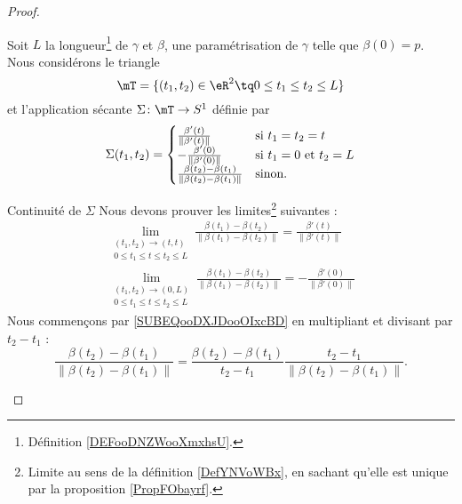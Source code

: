 \begin{proof}
\begin{subproof}
            Soit \( L\) la longueur\footnote{Définition \ref{DEFooDNZWooXmxhsU}.} de \( \gamma\) et \( \beta\), une paramétrisation de \( \gamma\) telle que \( \beta(0)=p\). Nous considérons le triangle
            \begin{equation}
                \mT=\{ (t_1,t_2)\in \eR^2\tq 0\leq t_1\leq t_2\leq L \}
            \end{equation}
            et l'application sécante \( \Sigma\colon \mT\to S^1\) définie par
            \begin{equation}
                \Sigma(t_1,t_2)=\begin{cases}
                    \frac{ \beta'(t) }{ \| \beta'(t) \| }    &   \text{si \( t_1=t_2=t\)}\\
                    -\frac{ \beta'(0) }{ \| \beta'(0) \| }    &   \text{si \( t_1=0\) et \( t_2=L\)}\\
                    \frac{ \beta(t_2)-\beta(t_1) }{ \| \beta(t_2)-\beta(t_1) \| }    &   \text{sinon}.
                \end{cases}
            \end{equation}
    \item[Continuité de \( \Sigma\)]
        Nous devons prouver les limites\footnote{Limite au sens de la définition \ref{DefYNVoWBx}, en sachant qu'elle est unique par la proposition \ref{PropFObayrf}.} suivantes :
        \begin{subequations}
            \begin{align}
                \lim_{\substack{(t_1,t_2)\to (t,t)\\0\leq t_1\leq t\leq t_2\leq L}}\frac{ \beta(t_1)-\beta(t_2) }{ \| \beta(t_1)-\beta(t_2) \| }=\frac{ \beta'(t) }{ \| \beta'(t) \| }      \label{SUBEQooDXJDooOIxcBD}  \\
                \lim_{\substack{(t_1,t_2)\to (0,L)\\0\leq t_1\leq t\leq t_2\leq L}}\frac{ \beta(t_1)-\beta(t_2) }{ \| \beta(t_1)-\beta(t_2) \| }=-\frac{ \beta'(0) }{ \| \beta'(0) \| }        \label{SUBEQooOXGSooXHEHHh}
            \end{align}
        \end{subequations}
        Nous commençons par \eqref{SUBEQooDXJDooOIxcBD} en multipliant et divisant par \( t_2-t_1\) :
        \begin{equation}
            \frac{ \beta(t_2)-\beta(t_1) }{ \|  \beta(t_2)-\beta(t_1)  \| }=\frac{  \beta(t_2)-\beta(t_1)  }{ t_2-t_1 }\frac{ t_2-t_1 }{ \|  \beta(t_2)-\beta(t_1)  \| }.
        \end{equation}

\end{subproof}
\end{proof}
